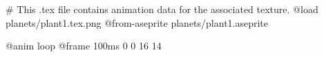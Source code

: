 # This .tex file contains animation data for the associated texture.
@load planets/plant1.tex.png
@from-aseprite planets/plant1.aseprite

@anim loop
	@frame 100ms 0 0 16 14
